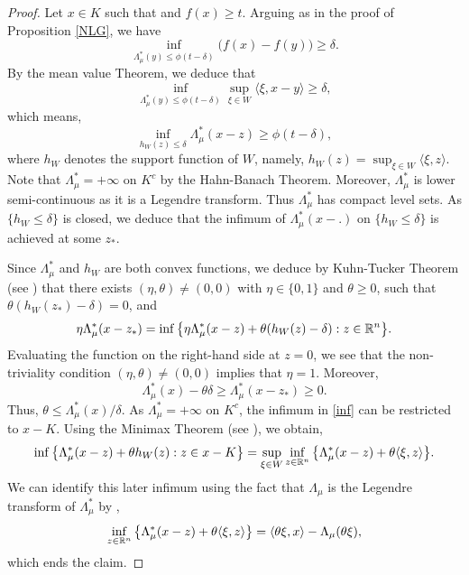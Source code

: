 \documentclass[a4paper,oneside,11pt]{article}
\begin{document}
\begin{proof}
Let $x \in K$ such that and $f(x) \geq t$. Arguing as in the proof of Proposition \ref{NLG}, we have
$$ \inf_{\Lambda^*_\mu(y) \leq \phi(t-\delta)} \big(f(x) - f(y)\big) \geq \delta.$$
By the mean value Theorem, we deduce that
$$ \inf_{\Lambda^*_\mu(y) \leq \phi(t-\delta)} \sup_{\xi \in W} \langle \xi, x-y \rangle \geq \delta,$$
which means,
$$ \inf_{h_W(z) \leq \delta} \Lambda^*_\mu(x-z) \geq \phi(t-\delta),$$
where $h_W$ denotes the support function of $W$, namely, $h_W(z) = \sup_{\xi \in W} \langle \xi, z\rangle$. Note that $\Lambda^*_\mu = +\infty$ on $K^c$ by the Hahn-Banach Theorem. Moreover, $\Lambda_\mu^*$ is lower semi-continuous as it is a Legendre transform. Thus $\Lambda^*_\mu$ has compact level sets. As $\{ h_W \leq \delta\}$ is closed, we deduce that the infimum of $\Lambda^*_\mu(x-.)$ on $\{ h_W \leq \delta\}$ is achieved at some $z_*$.



Since $\Lambda^*_\mu$ and $h_W$ are both convex functions, we deduce by Kuhn-Tucker Theorem (see \cite[Theorem 9.4]{Clarke}) that there exists $(\eta, \theta)\neq (0,0)$ with $\eta \in\{0,1\}$ and $\theta \geq 0$, such that $\theta(h_W(z_*) -\delta) = 0$, and
\begin{equation}  \label{inf} \eta \Lambda^*_\mu(x-z_*) = \inf \big\{ \eta \Lambda^*_\mu(x-z) + \theta (h_W(z)-\delta) : z \in \mathbb{R}^n \big\}.\end{equation}
Evaluating the function on the right-hand side at $z=0$, we see that the non-triviality condition $(\eta,\theta) \neq (0,0)$ implies that $\eta = 1$. Moreover, 
$$ \Lambda^*_\mu(x) - \theta \delta \geq \Lambda^*_\mu(x-z_*) \geq 0.$$
Thus, $\theta \leq \Lambda^*_\mu(x)/\delta$. 
 As $\Lambda^*_\mu = +\infty$ on $K^c$, the infimum in \eqref{inf} can be restricted to $x-K$. Using the Minimax Theorem (see \cite[Theorem 4.36]{Clarke}), we obtain,
$$ \inf \big\{ \Lambda^*_\mu(x-z) + \theta h_W(z) : z \in x-K \big\}= \sup_{\xi \in W} \inf_{z \in \mathbb{R}^n} \big\{ \Lambda^*_\mu(x-z) +\theta \langle \xi, z\rangle \big\}.$$
We can identify this later infimum using the fact that $\Lambda_\mu$ is the Legendre transform of $\Lambda^*_\mu$ by \cite[Theorem 4.21]{Clarke},
$$\inf_{z \in \mathbb{R}^n} \big\{ \Lambda^*_\mu(x-z) +\theta \langle \xi, z\rangle \big\} = \langle \theta \xi, x\rangle - \Lambda_\mu(\theta \xi),$$
which ends the claim.
 \end{proof}
\end{document}
